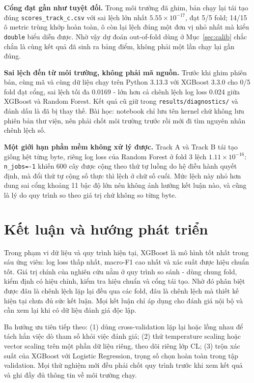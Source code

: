 \documentclass[12pt]{template/ai_conquer2026}
\begin{document}
\textbf{Cổng đạt gần như tuyệt đối.} Trong môi trường đã ghim, bản chạy lại tái
tạo đúng \texttt{scores\allowbreak\_track\allowbreak\_c.csv} với sai lệch lớn nhất
$5.55\times10^{-17}$, đạt 5/5 fold; 14/15 ô metric trùng khớp hoàn toàn, ô còn lại
lệch đúng một đơn vị nhỏ nhất mà kiểu \texttt{double} biểu diễn được. Nhờ vậy dự
đoán out-of-fold dùng ở Mục~\ref{sec:calib} chắc chắn là cùng kết quả đã sinh ra
bảng điểm, không phải một lần chạy lại gần đúng.

\textbf{Sai lệch đến từ môi trường, không phải mã nguồn.} Trước khi ghim phiên
bản, cùng mã và cùng dữ liệu chạy trên Python 3.13.3 với XGBoost 3.3.0 cho 0/5
fold đạt cổng, sai lệch tối đa 0.0169 - lớn hơn cả chênh lệch log loss 0.024 giữa
XGBoost và Random Forest. Kết quả cũ giữ trong \texttt{results/diagnostics/} và
đánh dấu là đã bị thay thế. Bài học: notebook chỉ lưu tên kernel chứ không lưu
phiên bản thư viện, nên phải chốt môi trường trước rồi mới đi tìm nguyên nhân
chênh lệch số.

\textbf{Một giới hạn phần mềm không xử lý được.} Track A và Track B tái tạo giống
hệt từng byte, riêng log loss của Random Forest ở fold 3 lệch
$1.11\times10^{-16}$: \texttt{n\_jobs=-1} khiến 600 cây được cộng theo thứ tự
luồng do hệ điều hành quyết định, mà đổi thứ tự cộng số thực thì lệch ở chữ số
cuối. Mức lệch này nhỏ hơn dung sai cổng khoảng 11 bậc độ lớn nên không ảnh hưởng
kết luận nào, và cũng là lý do quy trình so theo giá trị chứ không so từng byte.

\section{Kết luận và hướng phát triển}

Trong phạm vi dữ liệu và quy trình hiện tại, XGBoost là mô hình tốt nhất trong sáu
ứng viên: log loss thấp nhất, macro-F1 cao nhất và xác suất được hiệu chuẩn tốt.
Giá trị chính của nghiên cứu nằm ở quy trình so sánh - dùng chung fold, kiểm định
có hiệu chỉnh, kiểm tra hiệu chuẩn và cổng tái tạo. Nhờ đó phân biệt được đâu là
chênh lệch lặp lại đều qua các fold, đâu là chênh lệch mà thiết kế hiện tại chưa
đủ sức kết luận. Mọi kết luận chỉ áp dụng cho đánh giá nội bộ và cần xem lại khi
có dữ liệu đánh giá độc lập.

Ba hướng ưu tiên tiếp theo: (1) dùng cross-validation lặp lại hoặc lồng nhau để
tách hẳn việc dò tham số khỏi việc đánh giá; (2) thử temperature scaling hoặc
vector scaling trên một phần dữ liệu riêng, theo dõi riêng lớp CL; (3) trộn xác
suất của XGBoost với Logistic Regression, trọng số chọn hoàn toàn trong tập
validation. Mọi thử nghiệm mới đều phải chốt quy trình trước khi xem kết quả và
ghi đầy đủ thông tin về môi trường chạy.
\end{document}
